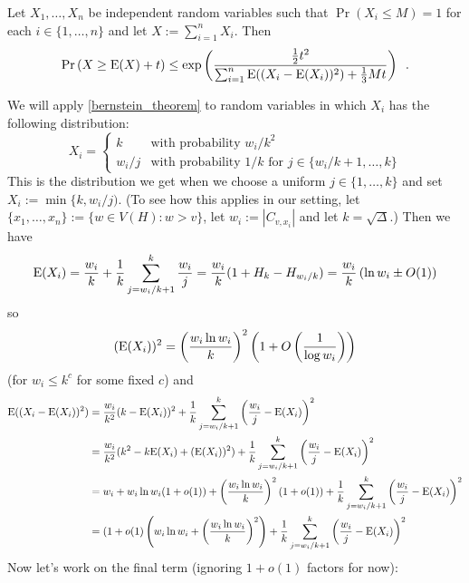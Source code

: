 \documentclass{patmorin}
\begin{document}
\begin{thm}\label{bernstein_theorem}
  Let $X_1,\ldots,X_n$ be independent random variables such that $\Pr(X_i\le M)=1$ for each $i\in\{1,\ldots,n\}$ and let $X:=\sum_{i=1}^n X_i$. Then
  \begin{equation}
    \Pr\left(X \ge \mathrm{E}(X)+ t\right)
      \le \exp\left(\frac{\tfrac{1}{2}t^2}{\sum_{i=1}^n \mathrm{E}((X_i-\mathrm{E}(X_i))^2)+\tfrac{1}{3}Mt}\right) \enspace . \label{bernstein}
  \end{equation}
\end{thm}
We will apply \cref{bernstein_theorem} to random variables in which $X_i$ has the following distribution:
\[
  X_i = \begin{cases}
          k & \text{with probability $w_i/k^2$} \\
          w_i/j & \text{with probability $1/k$ for $j\in\{w_i/k+1,\ldots,k\}$}
        \end{cases}
\]
This is the distribution we get when we choose a uniform $j\in\{1,\ldots,k\}$ and set $X_i:=\min\{k,w_i/j)$.  (To see how this applies in our setting, let $\{x_1,\ldots,x_n\}:=\{w\in V(H):w>v\}$, let $w_i:=|C_{v,x_i}|$ and let $k=\sqrt{\Delta}$.)
Then we have
\[
  \mathrm{E}(X_i)=\frac{w_i}{k} + \frac{1}{k}\sum_{j=w_i/k+1}^k \frac{w_i}{j}
  = \frac{w_i}{k}(1+H_{k}-H_{w_i/k}) = \frac{w_i}{k}\left(\ln w_i \pm O(1) \right)
\]
so
\[
  (\mathrm{E}(X_i))^2 = \left(\frac{w_i\ln w_i}{k}\right)^2\left(1+O\left(\frac{1}{\log w_i}\right)\right)
\]
(for $w_i\le k^c$ for some fixed $c$)
and
\begin{align*}
  \mathrm{E}((X_i-\mathrm{E}(X_i))^2)
  & = \frac{w_i}{k^2}(k-\mathrm{E}(X_i))^2
    + \frac{1}{k}\sum_{j=w_i/k+1}^k \left(\frac{w_i}{j}-\mathrm{E}(X_i)\right)^2 \\
  & = \frac{w_i}{k^2}(k^2-k\mathrm{E}(X_i)+(\mathrm{E}(X_i))^2)
    + \frac{1}{k}\sum_{j=w_i/k+1}^k \left(\frac{w_i}{j}-\mathrm{E}(X_i)\right)^2 \\
  & = w_i + w_i\ln w_i(1+o(1)) + \left(\frac{w_i\ln w_i}{k}\right)^2(1+o(1))
    + \frac{1}{k}\sum_{j=w_i/k+1}^k \left(\frac{w_i}{j}-\mathrm{E}(X_i)\right)^2 \\
  & = (1+o(1)\left(w_i\ln w_i + \left(\frac{w_i\ln w_i}{k}\right)^2\right)
    + \frac{1}{k}\sum_{j=w_i/k+1}^k \left(\frac{w_i}{j}-\mathrm{E}(X_i)\right)^2
\end{align*}
Now let's work on the final term (ignoring $1+o(1)$ factors for now):
\end{document}
